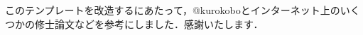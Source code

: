 \begin{acknowledgment}

このテンプレートを改造するにあたって，@kurokoboとインターネット上のいくつかの修士論文などを参考にしました．感謝いたします．

\end{acknowledgment}
